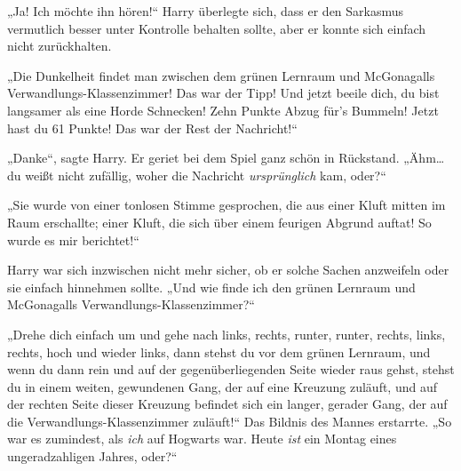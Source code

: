 „Ja! Ich möchte ihn hören!“ Harry überlegte sich, dass er den Sarkasmus vermutlich besser unter Kontrolle behalten sollte, aber er konnte sich einfach nicht zurückhalten.

„Die Dunkelheit findet man zwischen dem grünen Lernraum und McGonagalls Verwandlungs-Klassenzimmer! Das war der Tipp! Und jetzt beeile dich, du bist langsamer als eine Horde Schnecken! Zehn Punkte Abzug für’s Bummeln! Jetzt hast du 61 Punkte! Das war der Rest der Nachricht!“

„Danke“, sagte Harry. Er geriet bei dem Spiel ganz schön in Rückstand. „Ähm…du weißt nicht zufällig, woher die Nachricht \emph{ursprünglich} kam, oder?“

„Sie wurde von einer tonlosen Stimme gesprochen, die aus einer Kluft mitten im Raum erschallte; einer Kluft, die sich über einem feurigen Abgrund auftat! So wurde es mir berichtet!“

Harry war sich inzwischen nicht mehr sicher, ob er solche Sachen anzweifeln oder sie einfach hinnehmen sollte. „Und wie finde ich den grünen Lernraum und McGonagalls Verwandlungs-Klassenzimmer?“

„Drehe dich einfach um und gehe nach links, rechts, runter, runter, rechts, links, rechts, hoch und wieder links, dann stehst du vor dem grünen Lernraum, und wenn du dann rein und auf der gegenüberliegenden Seite wieder raus gehst, stehst du in einem weiten, gewundenen Gang, der auf eine Kreuzung zuläuft, und auf der rechten Seite dieser Kreuzung befindet sich ein langer, gerader Gang, der auf die Verwandlungs-Klassenzimmer zuläuft!“ Das Bildnis des Mannes erstarrte. „So war es zumindest, als \emph{ich} auf Hogwarts war. Heute \emph{ist} ein Montag eines ungeradzahligen Jahres, oder?“

